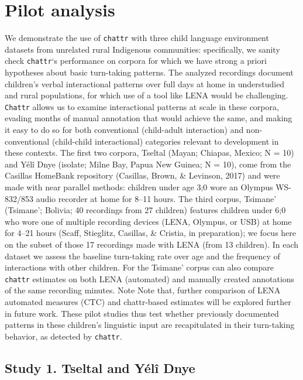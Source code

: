\documentclass[10pt, letterpaper]{article}
\begin{document}
\hypertarget{pilot-analysis}{%
\section{Pilot analysis}\label{pilot-analysis}}

We demonstrate the use of \texttt{chattr} with three child language
environment datasets from unrelated rural Indigenous communities:
specifically, we sanity check \texttt{chattr}`s performance on corpora
for which we have strong a priori hypotheses about basic turn-taking
patterns. The analyzed recordings document children's verbal
interactional patterns over full days at home in understudied and rural
populations, for which use of a tool like LENA would be challenging.
\texttt{Chattr} allows us to examine interactional patterns at scale in
these corpora, evading months of manual annotation that would achieve
the same, and making it easy to do so for both conventional (child-adult
interaction) and non-conventional (child-child interactional) categories
relevant to development in these contexts. The first two corpora,
Tseltal (Mayan; Chiapas, Mexico; N = 10) and Yélî Dnye (isolate; Milne
Bay, Papua New Guinea; N = 10), come from the Casillas HomeBank
repository (Casillas, Brown, \& Levinson, 2017) and were made with near
parallel methods: children under age 3;0 wore an Olympus WS-832/853
audio recorder at home for 8--11 hours. The third corpus, Tsimane'
(Tsimane'; Bolivia; 40 recordings from 27 children) features children
under 6;0 who wore one of multiple recording devices (LENA, Olympus, or
USB) at home for 4--21 hours (Scaff, Stieglitz, Casillas, \& Cristia, in
preparation); we focus here on the subset of those 17 recordings made
with LENA (from 13 children). In each dataset we assess the baseline
turn-taking rate over age and the frequency of interactions with other
children. For the Tsimane' corpus can also compare \texttt{chattr}
estimates on both LENA (automated) and manually created annotations of
the same recording minutes. Note Note that, further comparison of LENA
automated measures (CTC) and chattr-based estimates will be explored
further in future work. These pilot studies thus test whether previously
documented patterns in these children's linguistic input are
recapitulated in their turn-taking behavior, as detected by
\texttt{chattr}.

\hypertarget{study-1.-tseltal-and-yuxe9luxee-dnye}{%
\subsection{Study 1. Tseltal and Yélî
Dnye}\label{study-1.-tseltal-and-yuxe9luxee-dnye}}
\end{document}
